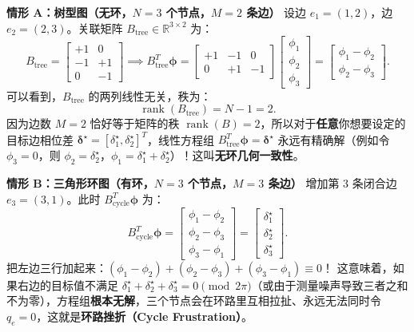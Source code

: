 \documentclass[UTF8, a4paper, 11pt]{ctexart}
\newcommand{\R}{\mathbb{R}}
\DeclareMathOperator{\rank}{rank}
\begin{document}
\begin{derivation}[$N=3$ 树图 vs. 三角形环图的关联矩阵 $B$ 手算对比]
\textbf{情形 A：树型图（无环，$N=3$ 个节点，$M=2$ 条边）}
设边 $e_1 = (1, 2)$，边 $e_2 = (2, 3)$。关联矩阵 $B_{\text{tree}} \in \R^{3 \times 2}$ 为：
\[
    B_{\text{tree}} = \begin{bmatrix} +1 & 0 \\ -1 & +1 \\ 0 & -1 \end{bmatrix} \implies B_{\text{tree}}^T \bm{\phi} = \begin{bmatrix} +1 & -1 & 0 \\ 0 & +1 & -1 \end{bmatrix} \begin{bmatrix} \phi_1 \\ \phi_2 \\ \phi_3 \end{bmatrix} = \begin{bmatrix} \phi_1 - \phi_2 \\ \phi_2 - \phi_3 \end{bmatrix}.
\]
可以看到，$B_{\text{tree}}$ 的两列线性无关，秩为：
\[
    \rank(B_{\text{tree}}) = N - 1 = 2.
\]
因为边数 $M = 2$ 恰好等于矩阵的秩 $\rank(B) = 2$，所以对于\textbf{任意}你想要设定的目标边相位差 $\bm{\delta}^\star = [\delta_1^\star, \delta_2^\star]^T$，线性方程组 $B_{\text{tree}}^T \bm{\phi} = \bm{\delta}^\star$ 永远有精确解（例如令 $\phi_3 = 0$，则 $\phi_2 = \delta_2^\star$，$\phi_1 = \delta_1^\star + \delta_2^\star$）！这叫\textbf{无环几何一致性}。

\medskip
\textbf{情形 B：三角形环图（有环，$N=3$ 个节点，$M=3$ 条边）}
增加第 $3$ 条闭合边 $e_3 = (3, 1)$。此时 $B_{\text{cycle}}^T \bm{\phi}$ 为：
\[
    B_{\text{cycle}}^T \bm{\phi} = \begin{bmatrix} \phi_1 - \phi_2 \\ \phi_2 - \phi_3 \\ \phi_3 - \phi_1 \end{bmatrix} = \begin{bmatrix} \delta_1^\star \\ \delta_2^\star \\ \delta_3^\star \end{bmatrix}.
\]
把左边三行加起来：$ (\phi_1 - \phi_2) + (\phi_2 - \phi_3) + (\phi_3 - \phi_1) \equiv 0 $！
这意味着，如果右边的目标值不满足 $\delta_1^\star + \delta_2^\star + \delta_3^\star = 0 \pmod{2\pi}$（或由于测量噪声导致三者之和不为零），方程组\textbf{根本无解}，三个节点会在环路里互相拉扯、永远无法同时令 $q_e = 0$，这就是\textbf{环路挫折（Cycle Frustration）}。
\end{derivation}
\end{document}
